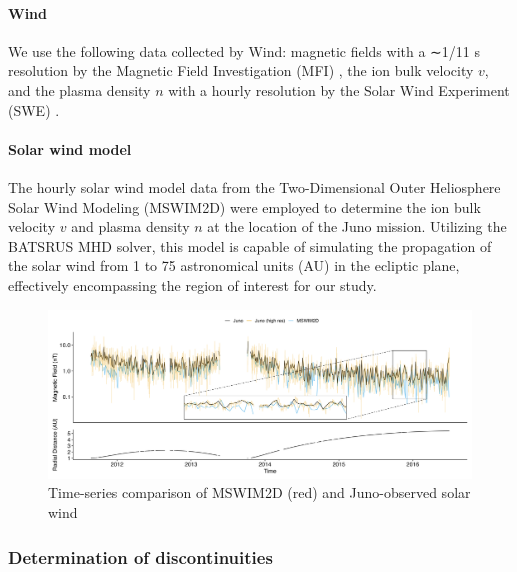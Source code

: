 \documentclass[
  letterpaper,
  DIV=11,
  numbers=noendperiod]{scrartcl}
\let\oldparagraph\paragraph
\renewcommand{\paragraph}[1]{\oldparagraph{#1}\mbox{}}
\begin{document}
\paragraph{Wind}\label{wind}

We use the following data collected by Wind: magnetic ﬁelds with a ∼1/11
s resolution by the Magnetic Field Investigation (MFI)
\citep{lepping1995}, the ion bulk velocity \(v\), and the plasma density
\(n\) with a hourly resolution by the Solar Wind Experiment (SWE)
\citep{ogilvie1995}.

\paragraph{Solar wind model}\label{solar-wind-model}

The hourly solar wind model data from the Two-Dimensional Outer
Heliosphere Solar Wind Modeling (MSWIM2D) \citep{keebler2022} were
employed to determine the ion bulk velocity \(v\) and plasma density
\(n\) at the location of the Juno mission. Utilizing the BATSRUS MHD
solver, this model is capable of simulating the propagation of the solar
wind from 1 to 75 astronomical units (AU) in the ecliptic plane,
effectively encompassing the region of interest for our study.

\begin{figure}[H]

{\centering \includegraphics{images/juno_model_validation.png}

}

\caption{Time-series comparison of MSWIM2D (red) and Juno-observed solar
wind}

\end{figure}%

\subsubsection{Determination of
discontinuities}\label{determination-of-discontinuities}
\end{document}
